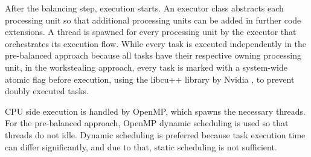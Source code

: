 After the balancing step, execution starts. An executor class abstracts each processing unit so that additional processing units can be added in further code extensions. A thread is spawned for every processing unit by the executor that orchestrates its execution flow. While every task is executed independently in the pre-balanced approach because all tasks have their respective owning processing unit, in the workstealing approach, every task is marked with a system-wide atomic flag before execution, using the libcu++ library by Nvidia \cite{NVIDIALibcudacxx2021}, to prevent doubly executed tasks.

CPU side execution is handled by OpenMP, which spawns the necessary threads. For the pre-balanced approach, OpenMP dynamic scheduling is used so that threads do not idle. Dynamic scheduling is preferred because task execution time can differ significantly, and due to that, static scheduling is not sufficient.


